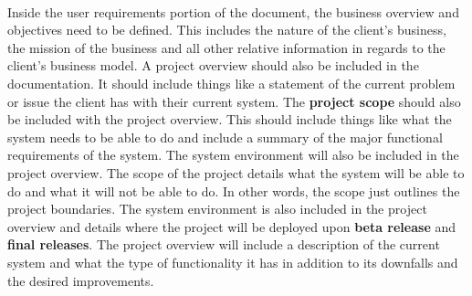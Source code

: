 \documentclass[letterpaper,12pt]{report}
\begin{document}
\paragraph*{}Inside the user requirements portion of the document, the business overview and objectives need to be defined. This includes the nature of the client’s business, the mission of the business and all other relative information in regards to the client’s business model. A project overview should also be included in the documentation. It should include things like a statement of the current problem or issue the client has with their current system. The \textbf{project scope} should also be included with the project overview. This should include things like what the system needs to be able to do and include a summary of the major functional requirements of the system. The system environment will also be included in the project overview. The scope of the project details what the system will be able to do and what it will not be able to do. In other words, the scope just outlines the project boundaries. The system environment is also included in the project overview and details where the project will be deployed upon \textbf{beta release} and \textbf{final releases}. The project overview will include a description of the current system and what the type of functionality it has in addition to its downfalls and the desired improvements.
\end{document}

